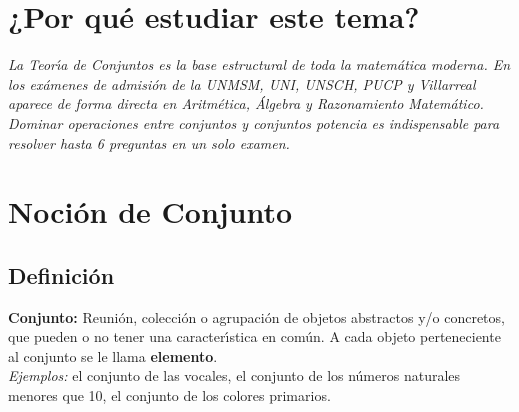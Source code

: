 



\section*{¿Por qu\'e estudiar este tema?}
\begin{tcolorbox}[
  enhanced, colback=AzulClaro!30, colframe=AzulMedio,
  arc=3pt, boxrule=0.6pt, left=10pt, right=10pt, top=6pt, bottom=6pt
]
\textit{La Teor\'{\i}a de Conjuntos es la base estructural de toda la matem\'atica
moderna. En los ex\'amenes de admisi\'on de la UNMSM, UNI, UNSCH, PUCP y Villarreal
aparece de forma directa en Aritm\'etica, \'Algebra y Razonamiento Matem\'atico.
Dominar operaciones entre conjuntos y conjuntos potencia es indispensable para
resolver hasta 6 preguntas en un solo examen.}
\end{tcolorbox}
\vspace{0.5cm}

\section{Noci\'on de Conjunto}

\subsection{Definici\'on}

\begin{cajadef}
  \textbf{Conjunto:} Reunión, colección o agrupación de objetos abstractos y/o
  concretos, que pueden o no tener una caracter\'{\i}stica en com\'un. A cada objeto
  perteneciente al conjunto se le llama \textbf{elemento}.\\[4pt]
  \textit{Ejemplos:} el conjunto de las vocales, el conjunto de los n\'umeros
  naturales menores que 10, el conjunto de los colores primarios.
\end{cajadef}

